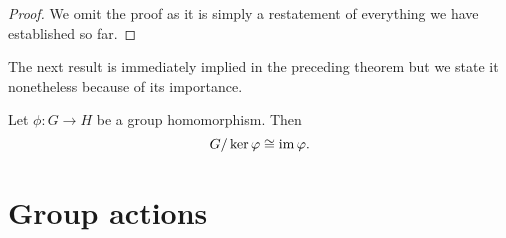\begin{proof}
    We omit the proof as it is simply a restatement of everything we have
    established so far.
\end{proof}

The next result is immediately implied in the preceding theorem but we state it
nonetheless because of its importance.

\begin{theorem}
    Let \(\phi: G \to H\) be a group homomorphism. Then
    \[
        G/\ker \varphi \cong \operatorname{im} \varphi.
    \]
\end{theorem}

\section{Group actions}

\begin{definition}
    
\end{definition}